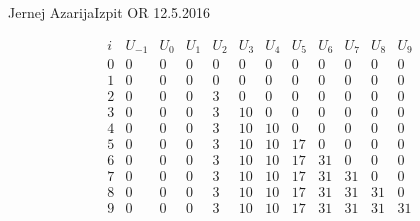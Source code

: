 \begin{naloga}{Jernej Azarija}{Izpit OR 12.5.2016}
\begin{odgovor}
\begin{tabela}
$$
\begin{array}{c|ccccccccccc}
i & U_{-1} & U_0 & U_1 & U_2 & U_3 & U_4 & U_5 & U_6 & U_7 & U_8 & U_9 \\ \hline
0 & 0 & 0 & 0 & 0 & 0 & 0 & 0 & 0 & 0 & 0 & 0 \\
1 & 0 & 0 & 0 & 0 & 0 & 0 & 0 & 0 & 0 & 0 & 0 \\
2 & 0 & 0 & 0 & 3 & 0 & 0 & 0 & 0 & 0 & 0 & 0 \\
3 & 0 & 0 & 0 & 3 & 10 & 0 & 0 & 0 & 0 & 0 & 0 \\
4 & 0 & 0 & 0 & 3 & 10 & 10 & 0 & 0 & 0 & 0 & 0 \\
5 & 0 & 0 & 0 & 3 & 10 & 10 & 17 & 0 & 0 & 0 & 0 \\
6 & 0 & 0 & 0 & 3 & 10 & 10 & 17 & 31 & 0 & 0 & 0 \\
7 & 0 & 0 & 0 & 3 & 10 & 10 & 17 & 31 & 31 & 0 & 0 \\
8 & 0 & 0 & 0 & 3 & 10 & 10 & 17 & 31 & 31 & 31 & 0 \\
9 & 0 & 0 & 0 & 3 & 10 & 10 & 17 & 31 & 31 & 31 & 31
\end{array}
$$
\end{tabela}

\end{odgovor}
\end{naloga}
